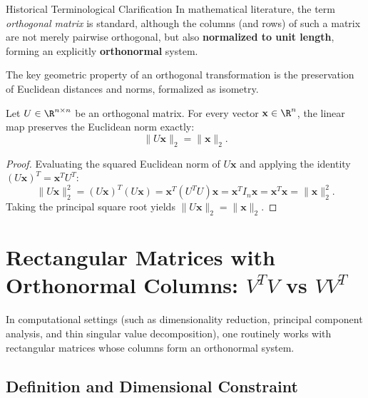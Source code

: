 \begin{noteblock}{Historical Terminological Clarification}
In mathematical literature, the term \textit{orthogonal matrix} is standard, although the columns (and rows) of such a matrix are not merely pairwise orthogonal, but also \textbf{normalized to unit length}, forming an explicitly \textbf{orthonormal} system.
\end{noteblock}

The key geometric property of an orthogonal transformation is the preservation of Euclidean distances and norms, formalized as isometry.

\begin{property}
\label{prop:square-euclidean-isometry}
Let $U \in \R^{n \times n}$ be an orthogonal matrix. For every vector $\mathbf{x} \in \R^n$, the linear map preserves the Euclidean norm exactly:
\begin{equation}
    \|U\mathbf{x}\|_2 = \|\mathbf{x}\|_2.
\end{equation}
\end{property}

\begin{proof}
Evaluating the squared Euclidean norm of $U\mathbf{x}$ and applying the identity $(U\mathbf{x})^T = \mathbf{x}^T U^T$:
\begin{equation}
    \|U\mathbf{x}\|_2^2 = (U\mathbf{x})^T (U\mathbf{x}) = \mathbf{x}^T (U^T U) \mathbf{x} = \mathbf{x}^T I_n \mathbf{x} = \mathbf{x}^T \mathbf{x} = \|\mathbf{x}\|_2^2.
\end{equation}
Taking the principal square root yields $\|U\mathbf{x}\|_2 = \|\mathbf{x}\|_2$.
\end{proof}

\FloatBarrier
\section[Rectangular Matrices with Orthonormal Columns]{Rectangular Matrices with Orthonormal Columns: \texorpdfstring{$V^T V$}{V\textasciicircum T V} vs \texorpdfstring{$V V^T$}{V V\textasciicircum T}}

In computational settings (such as dimensionality reduction, principal component analysis, and thin singular value decomposition), one routinely works with rectangular matrices whose columns form an orthonormal system.

\subsection{Definition and Dimensional Constraint}

